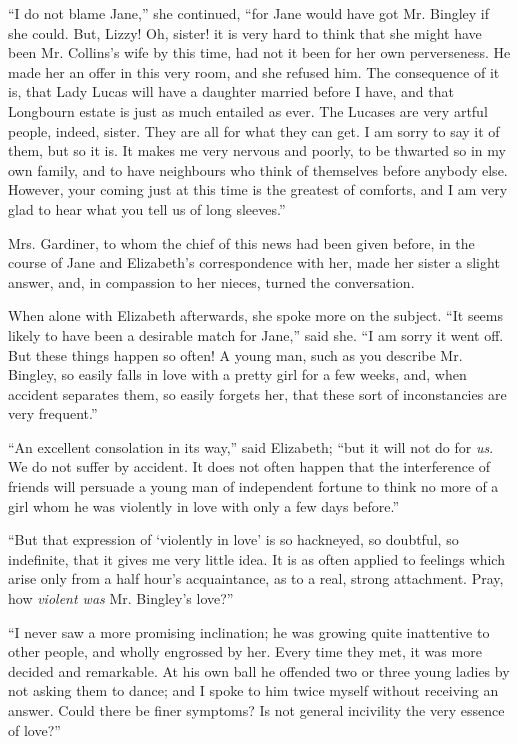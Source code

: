 ``I do not blame Jane,'' she continued, ``for Jane would have got Mr. Bingley if she could. But, Lizzy! Oh, sister! it is very hard to think that she might have been Mr. Collins's wife by this time, had not it been for her own perverseness. He made her an offer in this very room, and she refused him. The consequence of it is, that Lady Lucas will have a daughter married before I have, and that Longbourn estate is just as much entailed as ever. The Lucases are very artful people, indeed, sister. They are all for what they can get. I am sorry to say it of them, but so it is. It makes me very nervous and poorly, to be thwarted so in my own family, and to have neighbours who think of themselves before anybody else. However, your coming just at this time is the greatest of comforts, and I am very glad to hear what you tell us of long sleeves.''

Mrs. Gardiner, to whom the chief of this news had been given before, in the course of Jane and Elizabeth's correspondence with her, made her sister a slight answer, and, in compassion to her nieces, turned the conversation.

When alone with Elizabeth afterwards, she spoke more on the subject. ``It seems likely to have been a desirable match for Jane,'' said she. ``I am sorry it went off. But these things happen so often! A young man, such as you describe Mr. Bingley, so easily falls in love with a pretty girl for a few weeks, and, when accident separates them, so easily forgets her, that these sort of inconstancies are very frequent.''



``An excellent consolation in its way,'' said Elizabeth; ``but it will not do for \textit{us}. We do not suffer by accident. It does not often happen that the interference of friends will persuade a young man of independent fortune to think no more of a girl whom he was violently in love with only a few days before.''

``But that expression of `violently in love' is so hackneyed, so doubtful, so indefinite, that it gives me very little idea. It is as often applied to feelings which arise only from a half hour's acquaintance, as to a real, strong attachment. Pray, how \textit{violent was} Mr. Bingley's love?''

``I never saw a more promising inclination; he was growing quite inattentive to other people, and wholly engrossed by her. Every time they met, it was more decided and remarkable. At his own ball he offended two or three young ladies by not asking them to dance; and I spoke to him twice myself without receiving an answer. Could there be finer symptoms? Is not general incivility the very essence of love?''


